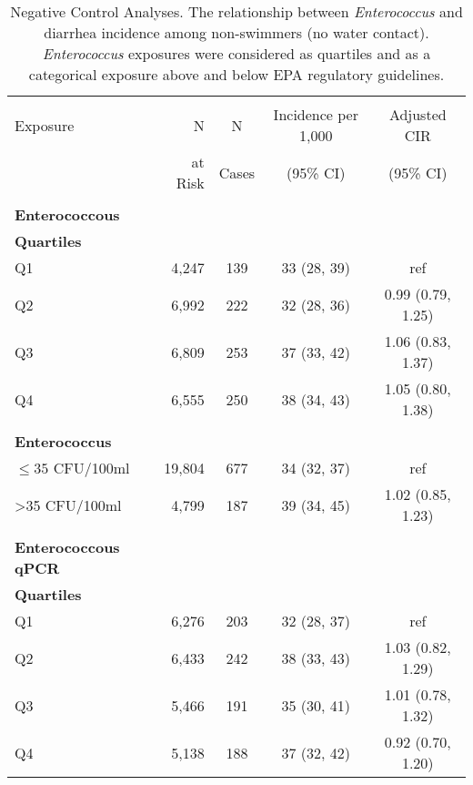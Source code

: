 \documentclass[12pt]{article}\usepackage[]{graphicx}\usepackage[]{color}
\begin{document}
\begin{table}[h!tb]
\begin{center}
\begin{footnotesize}
\begin{minipage}{0.9\textwidth}
\caption{Negative Control Analyses. The relationship between \emph{Enterococcus} and diarrhea incidence among non-swimmers (no water contact). \emph{Enterococcus} exposures were considered as quartiles and as a categorical exposure above and below EPA regulatory guidelines. \label{tab:negcontrol}}
\end{minipage}
\begin{tabular}{l rc c c}
& \\
Exposure & N        & N      & Incidence per 1,000 & Adjusted CIR \\
         & at Risk  & Cases  & (95\% CI)  & (95\% CI)    \\
\hline
& \\
\textbf{Enterococcous} \\
\textbf{Quartiles} \\
 Q1 & 4,247 &   139 & 33 (28, 39) & ref \\ 
  Q2 & 6,992 &   222 & 32 (28, 36) & 0.99 (0.79, 1.25) \\ 
  Q3 & 6,809 &   253 & 37 (33, 42) & 1.06 (0.83, 1.37) \\ 
  Q4 & 6,555 &   250 & 38 (34, 43) & 1.05 (0.80, 1.38) \\ 
  
& \\
\textbf{Enterococcus} \\
 $\leq35$ CFU/100ml & 19,804 &    677 & 34 (32, 37) & ref \\ 
  >35 CFU/100ml &  4,799 &    187 & 39 (34, 45) & 1.02 (0.85, 1.23) \\ 
  
& \\
\textbf{Enterococcous qPCR} \\
\textbf{Quartiles} \\
 Q1 & 6,276 &   203 & 32 (28, 37) & ref \\ 
  Q2 & 6,433 &   242 & 38 (33, 43) & 1.03 (0.82, 1.29) \\ 
  Q3 & 5,466 &   191 & 35 (30, 41) & 1.01 (0.78, 1.32) \\ 
  Q4 & 5,138 &   188 & 37 (32, 42) & 0.92 (0.70, 1.20) \\ 
  

\end{tabular}
\end{footnotesize}
\end{center}
\end{table}
\end{document}

